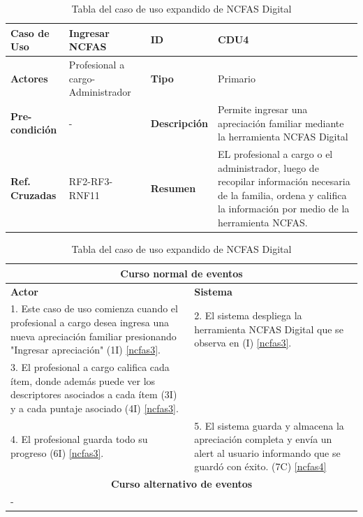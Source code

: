 \begin{table}[h!]
	\centering
	\begin{tabular}{|p{2cm}|p{3cm}|p{2cm}|p{4cm}|}
		\hline \textbf{Caso de Uso} & Ingresar NCFAS & \textbf{ID} & CDU4 \\ 
		\hline \textbf{Actores} & Profesional a cargo- Administrador & \textbf{Tipo} & Primario \\ 
		\hline \textbf{Pre-condición} & - & \textbf{Descripción} & Permite ingresar una apreciación familiar mediante la herramienta NCFAS Digital \\
		\hline \textbf{Ref. Cruzadas} & RF2-RF3-RNF11 & \textbf{Resumen} & EL profesional a cargo o el administrador, luego de recopilar información necesaria de la familia, ordena y califica la información por medio de la herramienta NCFAS.\\ 
		\hline
	\end{tabular}  
	\begin{tabular}{|p{6cm}|p{6cm}|}
		
		\multicolumn{2}{|c|}{\textbf{Curso normal de eventos}} \\
		\hline \textbf{Actor} & \textbf{Sistema} \\ 
		\hline 1. Este caso de uso comienza cuando el profesional a cargo desea ingresa una nueva apreciación familiar presionando "Ingresar apreciación" (1I) \ref{ncfas3}. & 2. El sistema despliega la herramienta NCFAS Digital que se observa en (I) \ref{ncfas3}.  \\ 
		3. El profesional a cargo califica cada ítem, donde además puede ver los descriptores asociados a cada ítem (3I) y a cada puntaje asociado (4I) \ref{ncfas3}.&  \\
		4. El profesional guarda todo su progreso (6I) \ref{ncfas3}. & 5. El sistema guarda y almacena la apreciación completa y envía un alert al usuario informando que se guardó con éxito. (7C) \ref{ncfas4} \\
		\hline
		\multicolumn{2}{|c|}{\textbf{Curso alternativo de eventos}} \\
		\hline
		\multicolumn{2}{|p{12cm}|}{-} \\
		\hline
	\end{tabular}
	\caption{Tabla del caso de uso expandido de NCFAS Digital}
	\label{tabcdu44}
\end{table}

\clearpage

